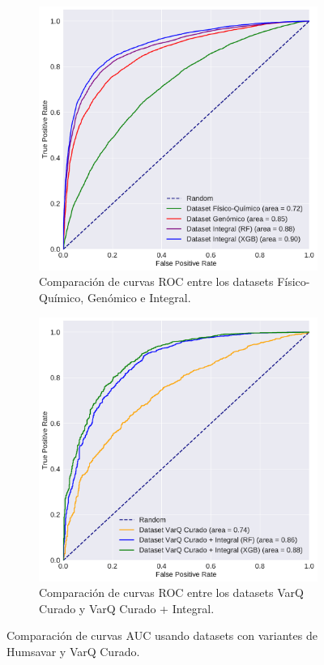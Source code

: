 \begin{figure}[H]
\centering
\begin{subfigure}[b]{0.6\textwidth}
    \centering
    \includegraphics[width=\textwidth]{documents/latex/figures/4/curvas_auc_humsavar.pdf}
    \caption{Comparación de curvas ROC entre los datasets Físico-Químico, Genómico e Integral.}
    \label{fig:curvas_auc_humsavar}
\end{subfigure}

\hfill
\hfill

\begin{subfigure}[b]{0.6\textwidth}
    \centering
    \includegraphics[width=\textwidth]{documents/latex/figures/4/curvas_auc_varq.pdf}
    \caption{Comparación de curvas ROC entre los datasets VarQ Curado y VarQ Curado + Integral.}
    \label{fig:curvas_auc_varq}
\end{subfigure}

\caption{Comparación de curvas AUC usando datasets con variantes de Humsavar y VarQ Curado.}
\end{figure}


